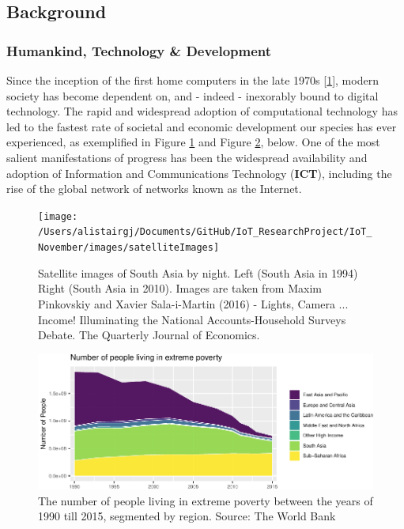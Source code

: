 \documentclass[11pt,]{article}
\begin{document}
\hypertarget{background}{%
\subsection{Background}\label{background}}

\hypertarget{humankind-technology-development}{%
\subsubsection{Humankind, Technology \&
Development}\label{humankind-technology-development}}

Since the inception of the first home computers in the late 1970s
{[}\protect\hyperlink{ref-pressAltairHistoryPersonal1993}{1}{]}, modern
society has become dependent on, and - indeed - inexorably bound to
digital technology. The rapid and widespread adoption of computational
technology has led to the fastest rate of societal and economic
development our species has ever experienced, as exemplified in Figure
\ref{fig:satelliteImagesAsia} and Figure \ref{fig:globalPovertyPlot},
below. One of the most salient manifestations of progress has been the
widespread availability and adoption of Information and Communications
Technology (\textbf{ICT}), including the rise of the global network of
networks known as the Internet.

\begin{figure}[H]

{\centering \texttt{[image: /Users/alistairgj/Documents/GitHub/IoT\_ResearchProject/IoT\_November/images/satelliteImages]} 

}

\caption{Satellite images of South Asia by night. Left (South Asia in 1994) Right (South Asia in 2010). Images are taken from Maxim Pinkovskiy and Xavier Sala-i-Martin (2016) - Lights, Camera ... Income! Illuminating the National Accounts-Household Surveys Debate. The Quarterly Journal of Economics.}\label{fig:satelliteImagesAsia}
\end{figure}

\begin{figure}[H]

{\centering \includegraphics{MD_Final_files/figure-latex/globalPovertyPlot-1} 

}

\caption{The number of people living in extreme poverty between the years of 1990 till 2015, segmented by region. Source: The World Bank}\label{fig:globalPovertyPlot}
\end{figure}
\end{document}
